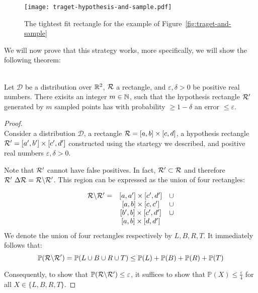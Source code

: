 \begin{figure}
    \begin{center}
        \texttt{[image: traget-hypothesis-and-sample.pdf]}
    \end{center}
    \caption{The tightest fit rectangle for the example of Figure~\ref{fig:traget-and-sample}}
    \label{fig:traget-hypothesis-and-sample}
\end{figure}



We will now prove that this strategy works, more specifically, we will show the following theorem:

\begin{theorem}
    \ \\
    Let \(\mathcal{D}\) be a distribution over \(\mathbb{R}^2\), \(\mathcal{R}\) a rectangle, and \(\varepsilon, \delta>0\) be positive real numbers.
    There exisits an integer \(m\in\mathbb{N}\), such that the hypothesis rectangle \(\mathcal{R}^\prime\) generated by \(m\) sampled points has with probability \(\ge 1 - \delta\) an error \(\le\varepsilon\).
\end{theorem}

\begin{proof}
    \ \\
    Consider a distribution \(\mathcal{D}\), a rectangle \(\mathcal{R} = [a, b]\times[c, d]\), a hypothesis rectangle \(\mathcal{R}^\prime = [a^\prime, b^\prime] \times [c^\prime, d^\prime]\) constructed using the startegy we described, and positive real numbers \(\varepsilon, \delta>0\).

    Note that \(\mathcal{R}^\prime\) cannot have false positives. In fact, \(\mathcal{R}^\prime\subset\mathcal{R}\) and therefore \(\mathcal{R}^\prime~\Delta\mathcal{R} = \mathcal{R}\backslash\mathcal{R}^\prime\). 
    This region can be expressed as the union of four rectangles: 

    \[
        \begin{array}{ccc}
            \mathcal{R}\backslash\mathcal{R}^\prime = & [a, a^\prime] \times [c^\prime, d^\prime]& \cup\\
                & [a, b] \times [c, c^\prime] & \cup\\
                & [b^\prime, b] \times [c^\prime, d^\prime] & \cup\\
                & [a, b] \times [d, d^\prime]
        \end{array}
    \]
    We denote the union of four rectangles respectively by \(L, B, R, T\). It immediately follows that:
    \[
        \mathbb{P}(\mathcal{R}\backslash\mathcal{R}^\prime) = \mathbb{P}(L \cup B \cup R \cup T) \le \mathbb{P}(L) + \mathbb{P}(B) + \mathbb{P}(R) + \mathbb{P}(T)    
    \]
    
    Consequently, to show that \(\mathbb{P}(\mathcal{R}\backslash\mathcal{R}^\prime) \le \varepsilon\), it suffices to show that \(\mathbb{P}(X) \le \frac{\varepsilon}{4}\) for all \(X\in\{L, B, R, T\}\).

\end{proof}